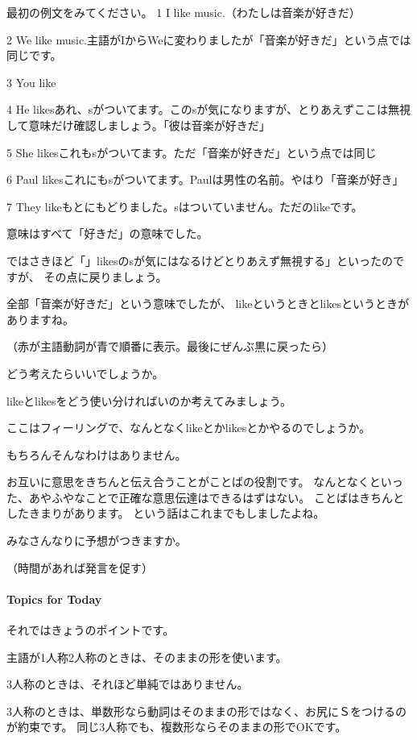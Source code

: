 \documentclass[book,jafontscale=0.9247]{jlreq}
\newcommand{\myMouse}{%
  {\large \ComputerMouse}
}
\begin{document}
\myMouse



最初の例文をみてください。
1 I like music.（わたしは音楽が好きだ）

2 We like music.主語がIからWeに変わりましたが「音楽が好きだ」という点では同じです。

3 You like

4 He likesあれ、sがついてます。このsが気になりますが、とりあえずここは無視して意味だけ確認しましょう。「彼は音楽が好きだ」

5 She likesこれもsがついてます。ただ「音楽が好きだ」という点では同じ

6 Paul likesこれにもsがついてます。Paulは男性の名前。やはり「音楽が好き」

7 They likeもとにもどりました。sはついていません。ただのlikeです。

意味はすべて「好きだ」の意味でした。

ではさきほど「」likesのsが気にはなるけどとりあえず無視する」といったのですが、
その点に戻りましょう。

全部「音楽が好きだ」という意味でしたが、
likeというときとlikesというときがありますね。

\myMouse

（赤が主語動詞が青で順番に表示。最後にぜんぶ黒に戻ったら）

どう考えたらいいでしょうか。

likeとlikesをどう使い分ければいのか考えてみましょう。

ここはフィーリングで、なんとなくlikeとかlikesとかやるのでしょうか。

もちろんそんなわけはありません。


お互いに意思をきちんと伝え合うことがことばの役割です。
なんとなくといった、あやふやなことで正確な意思伝達はできるはずはない。
ことばはきちんとしたきまりがあります。
という話はこれまでもしましたよね。

みなさんなりに予想がつきますか。

（時間があれば発言を促す）

\paragraph{Topics for Today}
それではきょうのポイントです。

主語が1人称2人称のときは、そのままの形を使います。

3人称のときは、それほど単純ではありません。

3人称のときは、単数形なら動詞はそのままの形ではなく、お尻にＳをつけるのが約束です。
同じ3人称でも、複数形ならそのままの形でOKです。
\end{document}
